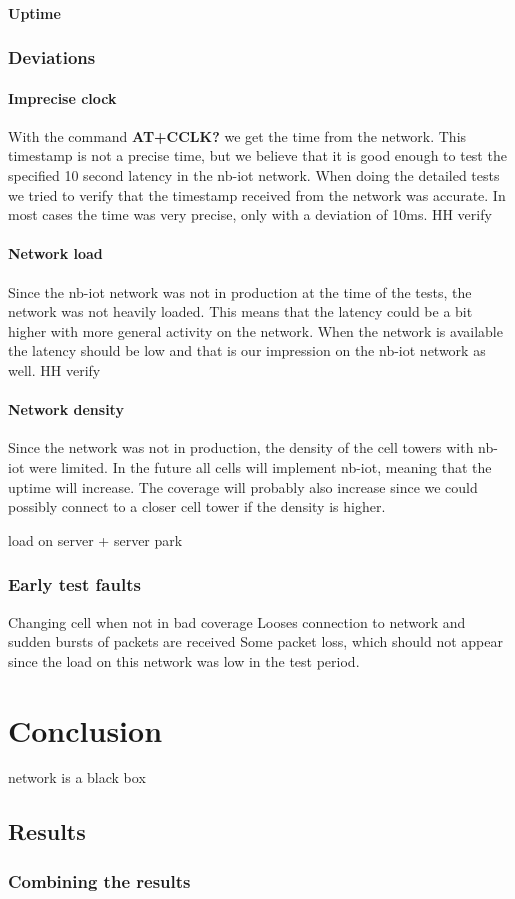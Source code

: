 \documentclass[USenglish]{ifimaster}  %
\begin{document}
\subsection{Uptime}

\section{Deviations} \label{section:deviations}
\subsection{Imprecise clock}
With the command \textbf{AT+CCLK?} we get the time from the network. This timestamp is not a precise time, but we believe that it is good enough to test the specified 10 second latency in the \acrshort{nb-iot} network. When doing the detailed tests we tried to verify that the timestamp received from the network was accurate. In most cases the time was very precise, only with a deviation of 10ms. HH verify

\subsection{Network load}
Since the \acrshort{nb-iot} network was not in production at the time of the tests, the network was not heavily loaded. This means that the latency could be a bit higher with more general activity on the network. When the network is available the latency should be low and that is our impression on the \acrshort{nb-iot} network as well. HH verify

\subsection{Network density}
Since the network was not in production, the density of the cell towers with \acrshort{nb-iot} were limited. In the future all cells will implement \acrshort{nb-iot}, meaning that the uptime will increase. The coverage will probably also increase since we could possibly connect to a closer cell tower if the density is higher.

load on server + server park

\section{Early test faults}
Changing cell when not in bad coverage
Looses connection to network and sudden bursts of packets are received
Some packet loss, which should not appear since the load on this network was low in the test period.


\part{Conclusion}                     %
network is a black box

\chapter{Results}                     %
\section{Combining the results}

\backmatter{}
\printbibliography
\printglossary[type=\acronymtype]
\end{document}
